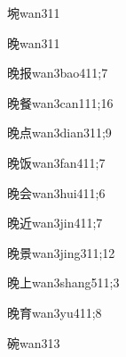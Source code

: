 \begin{verbete}{埦}{wan3}{11}
\end{verbete}

\begin{verbete}{晚}{wan3}{11}
\end{verbete}

\begin{verbete}{晚报}{wan3bao4}{11;7}
\end{verbete}

\begin{verbete}{晚餐}{wan3can1}{11;16}
\end{verbete}

\begin{verbete}{晚点}{wan3dian3}{11;9}
\end{verbete}

\begin{verbete}{晚饭}{wan3fan4}{11;7}
\end{verbete}

\begin{verbete}{晚会}{wan3hui4}{11;6}
\end{verbete}

\begin{verbete}{晚近}{wan3jin4}{11;7}
\end{verbete}

\begin{verbete}{晚景}{wan3jing3}{11;12}
\end{verbete}

\begin{verbete}{晚上}{wan3shang5}{11;3}
\end{verbete}

\begin{verbete}{晚育}{wan3yu4}{11;8}
\end{verbete}

\begin{verbete}{碗}{wan3}{13}
\end{verbete}

